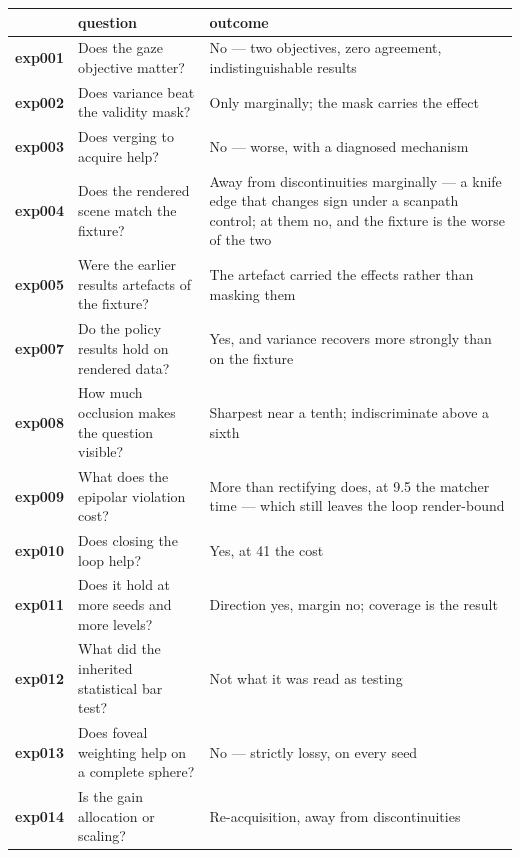 \begin{table}[htbp]
  \centering
  \small
  \begin{tabular}{@{}llp{}@{}}
    \toprule
    & question & outcome \\
    \midrule
    \textbf{exp001} & Does the gaze objective matter?
      & No --- two objectives, zero agreement, indistinguishable results \\
    \textbf{exp002} & Does variance beat the validity mask?
      & Only marginally; the mask carries the effect \\
    \textbf{exp003} & Does verging to acquire help?
      & No --- worse, with a diagnosed mechanism \\
    \textbf{exp004} & Does the rendered scene match the fixture?
      & Away from discontinuities marginally --- a knife edge that changes sign
        under a scanpath control; at them no, and the fixture is the worse of
        the two \\
    \textbf{exp005} & Were the earlier results artefacts of the fixture?
      & The artefact carried the effects rather than masking them \\
    \textbf{exp007} & Do the policy results hold on rendered data?
      & Yes, and variance recovers more strongly than on the fixture \\
    \textbf{exp008} & How much occlusion makes the question visible?
      & Sharpest near a tenth; indiscriminate above a sixth \\
    \textbf{exp009} & What does the epipolar violation cost?
      & More than rectifying does, at 9.5\texttimes{} the matcher time ---
        which still leaves the loop render-bound \\
    \textbf{exp010} & Does closing the loop help?
      & Yes, at 41\texttimes{} the cost \\
    \textbf{exp011} & Does it hold at more seeds and more levels?
      & Direction yes, margin no; coverage is the result \\
    \textbf{exp012} & What did the inherited statistical bar test?
      & Not what it was read as testing \\
    \textbf{exp013} & Does foveal weighting help on a complete sphere?
      & No --- strictly lossy, on every seed \\
    \textbf{exp014} & Is the gain allocation or scaling?
      & Re-acquisition, away from discontinuities \\
    \bottomrule
  \end{tabular}
\end{table}

